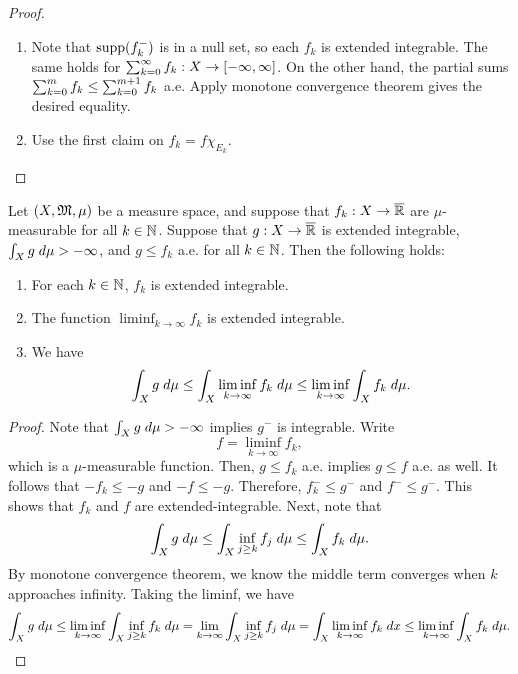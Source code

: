 \documentclass[a4paper]{article}
\begin{document}
\begin{proof}
\begin{enumerate}
  \item Note that $\operatorname{supp}(f_k^-)$ is in a null set, so each $f_k$ is 
  extended integrable. The same holds for $\sum_{k=0}^\infty f_k : 
  X \to [-\infty, \infty]$. On the other hand, the partial sums 
  $\sum_{k=0}^m f_k \leq \sum_{k=0}^{m+1} f_k$ a.e. Apply monotone 
  convergence theorem gives the desired equality.

  \item Use the first claim on $f_k = f \chi_{E_k}$.
\end{enumerate}
\end{proof}

\begin{thm}
Let $(X, \mathfrak{M}, \mu)$ be a measure space, and suppose 
that $f_k : X \to \overline{\mathbb{R}}$ are $\mu$-measurable 
for all $k \in \mathbb{N}$. Suppose that $g : X \to \overline{\mathbb{R}}$ is 
extended integrable, $\int_X g \; d \mu > - \infty$, and 
$g \leq f_k$ a.e. for all $k \in \mathbb{N}$. Then the following 
holds: 
\begin{enumerate}
\item For each $k \in \mathbb{N}$, $f_k$ is extended integrable. 
\item The function $\liminf_{k \to \infty} f_k$ 
is extended integrable. 
\item We have 
\[
\int_X g \; d \mu \leq \int_X \liminf_{k \to \infty} 
f_k \; d \mu \leq \liminf_{k \to \infty} \int_X f_k \; d \mu.
\]
\end{enumerate}
\end{thm}

\begin{proof}
Note that $\int_X g \; d \mu > - \infty$ implies $g^-$ is 
integrable. Write 
\[
  f = \liminf_{k \to \infty} f_k,
\]
which is 
a $\mu$-measurable function. Then, $g \leq f_k$ a.e. implies 
$g \leq f$ a.e. as well. It follows that $-f_k \leq -g$
and $-f \leq -g$. Therefore, 
$f_k^- \leq g^-$ and $f^- \leq g^-$.
This shows that 
$f_k$ and $f$ are extended-integrable. Next, note that 
\[
\int_X g \; d \mu \leq \int_X \inf_{j \geq k} f_j \; d \mu 
\leq \int_X f_k \; d \mu.
\]
By monotone convergence theorem, we know the middle term 
converges when $k$ approaches infinity. 
Taking the liminf, we have 
\[
\int_X g \; d \mu 
\leq 
\liminf_{k \to \infty} \int_X \inf_{j \geq k} f_k \; d \mu
= \lim_{k \to \infty} \int_X \inf_{j \geq k} f_j \; d \mu 
= \int_X \liminf_{k \to \infty} f_k \; d x
\leq \liminf_{k \to \infty} \int_X f_k \; d \mu.
\]
\end{proof}
\end{document}
